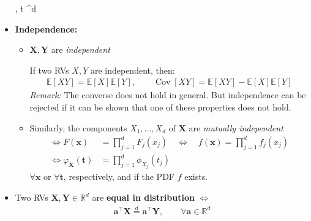\documentclass[a4paper,landscape,8pt,fleqn]{scrartcl}
\newcommand*\widefbox[1]{\fbox{\hspace{2em}#1\hspace{2em}}}		%
\renewcommand{\emph}[1]{\textbf{#1}}
\DeclareMathOperator{\Cov}{Cov}				%
\begin{document}
\begin{multicols*}{3}
\begin{itemize}
\begin{empheq}[box=\widefbox]{align*}
\varphi_{\bm X} &= \mathbb{E}\left[e^{i \bm t^\top \bm X} \right], \qquad \bm t \in {}^d
\end{empheq}
\item \emph{Independence:}
\begin{itemize}
\item $\bm X, \bm Y$ are \textit{independent}
If two RVs $X, Y$ are independent, then:
\begin{align*}
\mathbb{E}[X Y] = \mathbb{E}[X] \mathbb{E}[Y], \qquad \Cov[X Y] = \mathbb{E}[X Y] - \mathbb{E}[X] \mathbb{E}[Y]
\end{align*}
\textit{Remark:} The converse does not hold in general. But independence can be rejected if it can be shown that one of these properties does not hold.
\item Similarly, the components $X_1, \ldots, X_d$ of $\bm X$ are \textit{mutually independent}
\begin{align*}
\iff F(\bm x) &= \prod_{j=1}^d F_j(x_j) \quad \iff \quad f(\bm x) = \prod_{j=1}^d f_j(x_j) \\
\iff \varphi_{\bm X}(\bm t) &= \prod_{j=1}^d \phi_{X_j}(t_j)
\end{align*}
$\forall \bm x$ or $\forall \bm t$, respectively, and if the PDF $f$ exists.
\end{itemize}
\item Two RVs $\bm X, \bm Y \in \mathbb{R}^d$ are \emph{equal in distribution} $\iff$
\begin{align*}
\bm a^\top \bm X \overset{d}{=} \bm a^\top \bm Y, \qquad \forall \bm a \in \mathbb{R}^d
\end{align*}
\end{itemize}


\end{multicols*}
\end{document}
